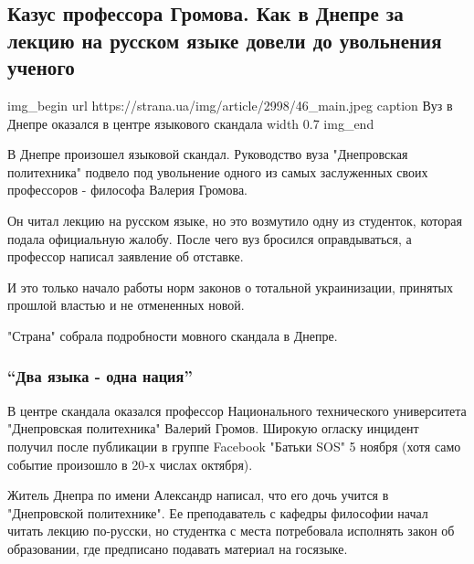  
 
 

\subsection{Казус профессора Громова. Как в Днепре за лекцию на русском языке довели до увольнения ученого}
\label{sec:09_11_2020.news.ua.strana.1.mova_dnepr_professor}

\ifcmt
img_begin 
	url https://strana.ua/img/article/2998/46_main.jpeg
	caption Вуз в Днепре оказался в центре языкового скандала 
	width 0.7
img_end
\fi

В Днепре произошел языковой скандал. Руководство вуза "Днепровская политехника"
подвело под увольнение одного из самых заслуженных своих профессоров - философа
Валерия Громова.

Он читал лекцию на русском языке, но это возмутило одну из студенток, которая
подала официальную жалобу. После чего вуз бросился оправдываться, а профессор
написал заявление об отставке. 

И это только начало работы норм законов о тотальной украинизации, принятых
прошлой властью и не отмененных новой. 

"Страна" собрала подробности мовного скандала в Днепре.

\subsubsection{\enquote{Два языка - одна нация}}

В центре скандала оказался профессор Национального технического университета
"Днепровская политехника" Валерий Громов. Широкую огласку инцидент получил
после публикации в группе Facebook "Батьки SOS" 5 ноября (хотя само событие
произошло в 20-х числах октября).

Житель Днепра по имени Александр написал, что его дочь учится в "Днепровской
политехнике". Ее преподаватель с кафедры философии начал читать лекцию
по-русски, но студентка с места потребовала исполнять закон об образовании, где
предписано подавать материал на госязыке.

